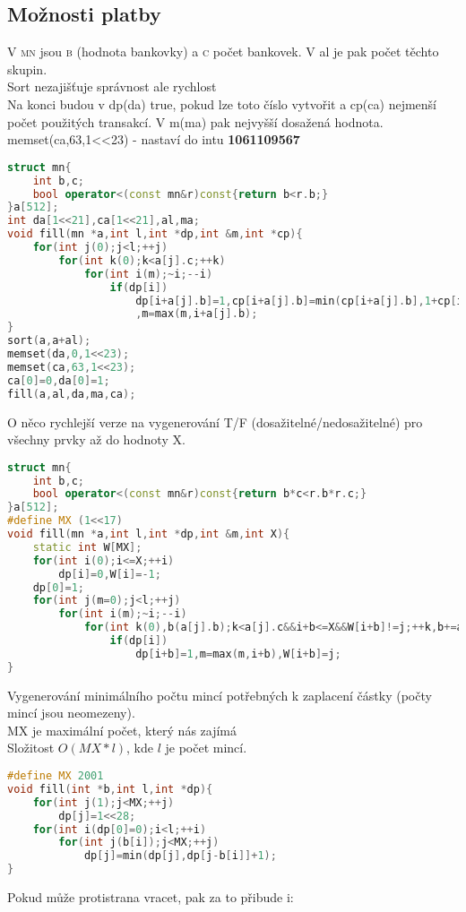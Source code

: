 \documentclass[11pt]{article}
\begin{document}
\subsection{Možnosti platby}
V \textsc{mn} jsou \textsc{b} (hodnota bankovky) a \textsc{c} počet bankovek. V al je pak počet těchto skupin.
\\Sort nezajišťuje správnost ale rychlost
\\Na konci budou v dp(da) true, pokud lze toto číslo vytvořit a cp(ca) nejmenší počet použitých transakcí. V m(ma) pak nejvyšší dosažená hodnota.
\\memset(ca,63,1<<23) - nastaví do intu \textbf{1061109567}
\begin{lstlisting}[language=C++]
struct mn{
    int b,c;
    bool operator<(const mn&r)const{return b<r.b;}
}a[512];
int da[1<<21],ca[1<<21],al,ma;
void fill(mn *a,int l,int *dp,int &m,int *cp){
    for(int j(0);j<l;++j)
        for(int k(0);k<a[j].c;++k)
            for(int i(m);~i;--i)
                if(dp[i])
                    dp[i+a[j].b]=1,cp[i+a[j].b]=min(cp[i+a[j].b],1+cp[i])
                    ,m=max(m,i+a[j].b);
}
sort(a,a+al);
memset(da,0,1<<23);
memset(ca,63,1<<23);
ca[0]=0,da[0]=1;
fill(a,al,da,ma,ca);
\end{lstlisting}
O něco rychlejší verze na vygenerování T/F (dosažitelné/nedosažitelné) pro všechny prvky až do hodnoty \textsf{X}.
\begin{lstlisting}[language=C++]
struct mn{
    int b,c;
    bool operator<(const mn&r)const{return b*c<r.b*r.c;}
}a[512];
#define MX (1<<17)
void fill(mn *a,int l,int *dp,int &m,int X){
    static int W[MX];
    for(int i(0);i<=X;++i)
        dp[i]=0,W[i]=-1;
    dp[0]=1;
    for(int j(m=0);j<l;++j)
        for(int i(m);~i;--i)
            for(int k(0),b(a[j].b);k<a[j].c&&i+b<=X&&W[i+b]!=j;++k,b+=a[j].b)
                if(dp[i])
                    dp[i+b]=1,m=max(m,i+b),W[i+b]=j;
}
\end{lstlisting}
Vygenerování minimálního počtu mincí potřebných k zaplacení částky (počty mincí jsou neomezeny).
\\MX je maximální počet, který nás zajímá
\\Složitost $O(MX*l)$, kde $l$ je počet mincí.
\begin{lstlisting}[language=C++]
#define MX 2001
void fill(int *b,int l,int *dp){
    for(int j(1);j<MX;++j)
        dp[j]=1<<28;
    for(int i(dp[0]=0);i<l;++i)
        for(int j(b[i]);j<MX;++j)
            dp[j]=min(dp[j],dp[j-b[i]]+1);
}
\end{lstlisting}
Pokud může protistrana vracet, pak za to přibude i:
\end{document}
